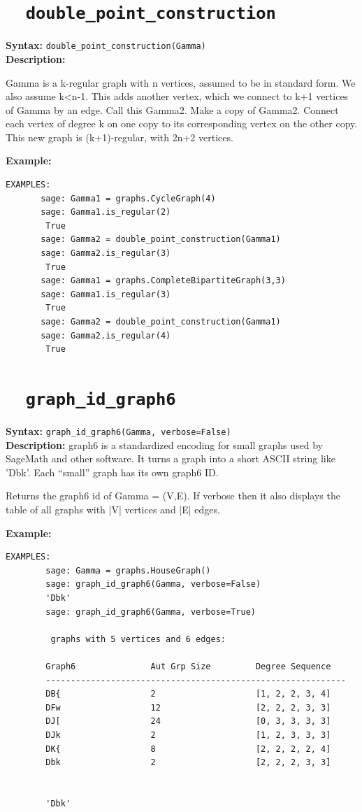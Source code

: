 \documentclass{article}
\begin{document}
\section{\tt \ \ double\_point\_construction}

\textbf{Syntax:} \verb}double_point_construction(Gamma)}\\

\textbf{Description:}

Gamma is a k-regular graph with n vertices, assumed to be
   in standard form. We also assume k<n-1. This adds another vertex, 
   which we connect to k+1 vertices of Gamma by an edge. 
   Call this Gamma2. Make a copy of Gamma2. Connect each 
   vertex of degree k on one copy to its corresponding vertex 
   on the other copy. This new graph is (k+1)-regular, with 
   2n+2 vertices.

\textbf{Example:}
\begin{verbatim}
EXAMPLES:
       sage: Gamma1 = graphs.CycleGraph(4)
       sage: Gamma1.is_regular(2)
        True
       sage: Gamma2 = double_point_construction(Gamma1)
       sage: Gamma2.is_regular(3)
        True
       sage: Gamma1 = graphs.CompleteBipartiteGraph(3,3)
       sage: Gamma1.is_regular(3)
        True
       sage: Gamma2 = double_point_construction(Gamma1)
       sage: Gamma2.is_regular(4)
        True
\end{verbatim}

\section{\tt \ \ graph\_id\_graph6}
\textbf{Syntax:} \verb}graph_id_graph6(Gamma, verbose=False)}\\

\textbf{Description:}
graph6 is a standardized encoding for small graphs used by SageMath and other software.
It turns a graph into a short ASCII string like 'Dbk'.
Each ``small'' graph has its own graph6 ID.

Returns the graph6 id of Gamma = (V,E). 
    If verbose then it also displays the table of all graphs with 
    |V| vertices and |E| edges.


\textbf{Example:}
\begin{verbatim}
EXAMPLES:
        sage: Gamma = graphs.HouseGraph()
        sage: graph_id_graph6(Gamma, verbose=False)
        'Dbk'
        sage: graph_id_graph6(Gamma, verbose=True)

         graphs with 5 vertices and 6 edges:

        Graph6               Aut Grp Size         Degree Sequence     
        ------------------------------------------------------------
        DB{                  2                    [1, 2, 2, 3, 4]     
        DFw                  12                   [2, 2, 2, 3, 3]     
        DJ[                  24                   [0, 3, 3, 3, 3]     
        DJk                  2                    [1, 2, 3, 3, 3]     
        DK{                  8                    [2, 2, 2, 2, 4]     
        Dbk                  2                    [2, 2, 2, 3, 3]     


        'Dbk'
\end{verbatim}
\end{document}
